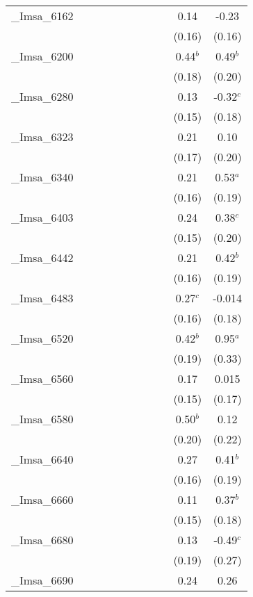 \documentclass[]{article}
\begin{document}
\begin{tabular}{lcccccccccc}
\_Imsa\_6162 &  &  &  &  &  &  &  &  & 0.14 & -0.23 \\
 &  &  &  &  &  &  &  &  & (0.16) & (0.16) \\
\_Imsa\_6200 &  &  &  &  &  &  &  &  & 0.44$^b$ & 0.49$^b$ \\
 &  &  &  &  &  &  &  &  & (0.18) & (0.20) \\
\_Imsa\_6280 &  &  &  &  &  &  &  &  & 0.13 & -0.32$^c$ \\
 &  &  &  &  &  &  &  &  & (0.15) & (0.18) \\
\_Imsa\_6323 &  &  &  &  &  &  &  &  & 0.21 & 0.10 \\
 &  &  &  &  &  &  &  &  & (0.17) & (0.20) \\
\_Imsa\_6340 &  &  &  &  &  &  &  &  & 0.21 & 0.53$^a$ \\
 &  &  &  &  &  &  &  &  & (0.16) & (0.19) \\
\_Imsa\_6403 &  &  &  &  &  &  &  &  & 0.24 & 0.38$^c$ \\
 &  &  &  &  &  &  &  &  & (0.15) & (0.20) \\
\_Imsa\_6442 &  &  &  &  &  &  &  &  & 0.21 & 0.42$^b$ \\
 &  &  &  &  &  &  &  &  & (0.16) & (0.19) \\
\_Imsa\_6483 &  &  &  &  &  &  &  &  & 0.27$^c$ & -0.014 \\
 &  &  &  &  &  &  &  &  & (0.16) & (0.18) \\
\_Imsa\_6520 &  &  &  &  &  &  &  &  & 0.42$^b$ & 0.95$^a$ \\
 &  &  &  &  &  &  &  &  & (0.19) & (0.33) \\
\_Imsa\_6560 &  &  &  &  &  &  &  &  & 0.17 & 0.015 \\
 &  &  &  &  &  &  &  &  & (0.15) & (0.17) \\
\_Imsa\_6580 &  &  &  &  &  &  &  &  & 0.50$^b$ & 0.12 \\
 &  &  &  &  &  &  &  &  & (0.20) & (0.22) \\
\_Imsa\_6640 &  &  &  &  &  &  &  &  & 0.27 & 0.41$^b$ \\
 &  &  &  &  &  &  &  &  & (0.16) & (0.19) \\
\_Imsa\_6660 &  &  &  &  &  &  &  &  & 0.11 & 0.37$^b$ \\
 &  &  &  &  &  &  &  &  & (0.15) & (0.18) \\
\_Imsa\_6680 &  &  &  &  &  &  &  &  & 0.13 & -0.49$^c$ \\
 &  &  &  &  &  &  &  &  & (0.19) & (0.27) \\
\_Imsa\_6690 &  &  &  &  &  &  &  &  & 0.24 & 0.26 \\

\end{tabular}
\end{document}
